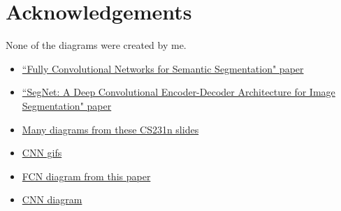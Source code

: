 \documentclass{article}
\begin{document}
\section{Acknowledgements}
None of the diagrams were created by me.
\begin{itemize}
    \item \href{https://people.eecs.berkeley.edu/~jonlong/long_shelhamer_fcn.pdf/}{``Fully Convolutional Networks for Semantic Segmentation" paper}
    \item \href{https://arxiv.org/pdf/1511.00561.pdf}{``SegNet: A Deep Convolutional
Encoder-Decoder Architecture for Image
Segmentation" paper}
    \item \href{http://cs231n.stanford.edu/slides/2017/cs231n_2017_lecture11.pdf}{Many diagrams from these CS231n slides}
    \item \href{https://github.com/vdumoulin/conv_arithmetic}{CNN gifs}
     \item \href{https://www.cv-foundation.org/openaccess/content_iccv_2015/papers/Noh_Learning_Deconvolution_Network_ICCV_2015_paper.pdf}{FCN diagram from this paper}
         \item \href{   https://www.kernix.com/doc/data/cnn.png}{CNN diagram}
\end{itemize}
\end{document}
